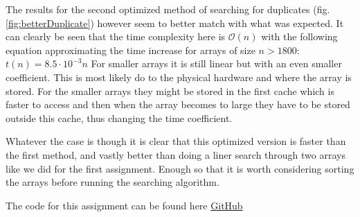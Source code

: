 \documentclass[a4paper,11pt]{article}
\begin{document}
The results for the second optimized method of searching for duplicates
(fig. \ref{fig:betterDuplicate}) however seem to better match with what was expected. It can clearly
be seen that the time complexity here is $\mathcal{O}(n)$ with the following equation approximating
the time increase for arrays of size $n>1800$: $t(n)=8.5\cdot 10^{-3}n$
For smaller arrays it is still linear but with an even smaller coefficient. This is most likely do to
the physical hardware and where the array is stored. For the smaller arrays they might be stored in the
first cache which is faster to access and then when the array becomes to large they have to be stored
outside this cache, thus changing the time coefficient.

Whatever the case is though it is clear that this optimized version is faster than the first method,
and vastly better than doing a liner search through two arrays like we did for the first assignment.
Enough so that it is worth considering sorting the arrays before running the searching algorithm.

The code for this assignment can be found here \href{https://github.com/adrian-jonsson-sjoedin/ID1021-AlgoData/blob/main/Tasks/Advantage-of-sorted-data/SortingAndSearching/src/Main.java}{GitHub}
\end{document}
